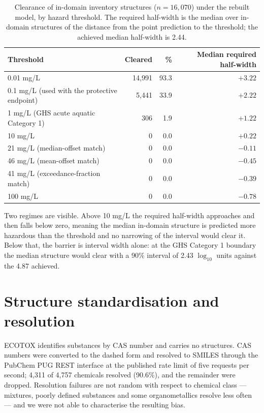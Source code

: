 \documentclass[11pt]{article}
\begin{document}
\begin{table}[h]
\centering
\caption{Clearance of in-domain inventory structures ($n=16{,}070$) under the
rebuilt model, by hazard threshold. The required half-width is the median over
in-domain structures of the distance from the point prediction to the threshold;
the achieved median half-width is 2.44.}
\small
\begin{tabular}{lrrr}
\toprule
Threshold & Cleared & \% & Median required half-width \\
\midrule
0.01 mg/L & 14{,}991 & 93.3 & $+3.22$ \\
0.1 mg/L (used with the protective endpoint) & 5{,}441 & 33.9 & $+2.22$ \\
1 mg/L (GHS acute aquatic Category 1) & 306 & 1.9 & $+1.22$ \\
10 mg/L & 0 & 0.0 & $+0.22$ \\
21 mg/L (median-offset match) & 0 & 0.0 & $-0.11$ \\
46 mg/L (mean-offset match) & 0 & 0.0 & $-0.45$ \\
41 mg/L (exceedance-fraction match) & 0 & 0.0 & $-0.39$ \\
100 mg/L & 0 & 0.0 & $-0.78$ \\
\bottomrule
\end{tabular}
\end{table}

Two regimes are visible. Above 10 mg/L the required half-width approaches and
then falls below zero, meaning the median in-domain structure is predicted more
hazardous than the threshold and no narrowing of the interval would clear it.
Below that, the barrier is interval width alone: at the GHS Category 1 boundary
the median structure would clear with a 90\% interval of 2.43 $\log_{10}$ units
against the 4.87 achieved.

\section{Structure standardisation and resolution}

ECOTOX identifies substances by CAS number and carries no structures. CAS
numbers were converted to the dashed form and resolved to SMILES through the
PubChem PUG REST interface at the published rate limit of five requests per
second; 4{,}311 of 4{,}757 chemicals resolved (90.6\%), and the remainder were
dropped. Resolution failures are not random with respect to chemical class ---
mixtures, poorly defined substances and some organometallics resolve less often
--- and we were not able to characterise the resulting bias.
\end{document}
